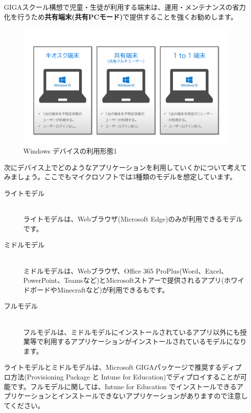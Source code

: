 GIGAスクール構想で児童・生徒が利用する端末は、運用・メンテナンスの省力化を行うため\textbf{共有端末(共有PCモード)}で提供することを強くお勧めします。


\begin{figure}[htbp]
    \centering
    \includegraphics[width=12cm]{figures/HowtoUsePC-1.png}
    \caption{Windows デバイスの利用形態1}
    \label{fig:Windowデバイスの利用形態1}
\end{figure}

次にデバイス上でどのようなアプリケーションを利用していくかについて考えてみましょう。ここでもマイクロソフトでは3種類のモデルを想定しています。

\begin{description}
    \item[ライトモデル]\mbox{}\\
    ライトモデルは、Webブラウザ(Microsoft Edge)のみが利用できるモデルです。
    \item[ミドルモデル]\mbox{}\\
    ミドルモデルは、Webブラウザ、Office 365 ProPlus(Word、Excel、PowerPoint、Teamsなど)とMicrosoftストアーで提供されるアプリ(ホワイドボードやMinecraftなど)が利用できるもです。
    \item[フルモデル]\mbox{}\\
    フルモデルは、ミドルモデルにインストールされているアプリ以外にも授業等で利用するアプリケーションがインストールされているモデルになります。
\end{description}

ライトモデルとミドルモデルは、Microsoft GIGAパッケージで推奨するディプロ方法(Provisioning Package と Intune for Education)でディプロイすることが可能です。フルモデルに関しては、Intune for Education でインストールできるアプリケーションとインストールできないアプリケーションがありますので注意してください。

